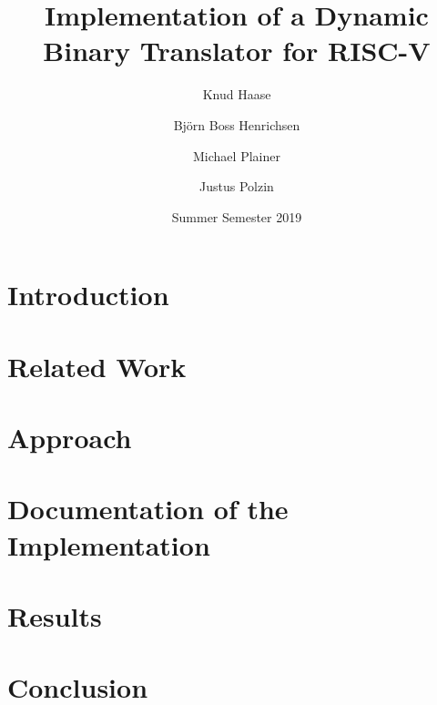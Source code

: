 \documentclass[course=erap]{aspdoc}
\author{Knud Haase \and Björn Boss Henrichsen \and Michael Plainer \and Justus Polzin}
\date{Summer Semester 2019}
\title{Implementation of a Dynamic Binary Translator for RISC-V}
\begin{document}
\maketitle
\setcounter{tocdepth}{2} %
\tableofcontents

\section{Introduction} %


\section{Related Work} %


\section{Approach} %


\section{Documentation of the Implementation} %


\pagebreak
\section{Results} %


\pagebreak
\section{Conclusion} %


\pagebreak
\printbibliography[heading=bibintoc,title={References}]

\pagebreak
\begin{appendices}

\end{appendices}
\end{document}
